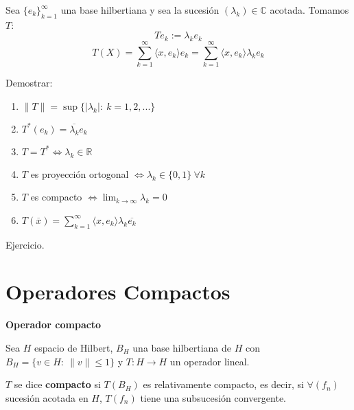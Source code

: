 \documentclass[openany]{book}
\begin{document}
\begin{proposition}
    Sea $ \{e_{k}\}_{k=1} ^{\infty}$ una base hilbertiana y sea la sucesión $ (\lambda _{k}) \in \mathbb{C}$ acotada. Tomamos $ T$:
    $$ Te_{k} := \lambda _{k} e_{k} $$
    $$ T (X) = \sum\limits_{k=1}^{\infty} \langle x, e_{k} \rangle e_{k} = \sum\limits_{k=1}^{\infty} \langle x, e_{k}  \rangle \lambda_{k} e_k $$
    
    
    Demostrar:
    \begin{enumerate}
        \item $ \|T\| = \sup \{|\lambda_k|:\ k = 1,2,...\}$
        \item $ T^* (e_k) =\overline{\lambda_k} e_k $
        \item $ T = T^* \iff \lambda_k \in \mathbb{R}$
        \item $ T$ es proyección ortogonal $ \iff \lambda_k \in \{0,1\} \ \forall k $
        \item $ T$ es compacto $ \iff \lim_{k \to \infty}\lambda_k = 0$
        \item $ T(\overline{x}) = \sum_{k=1}^{\infty} \langle x, e_k \rangle \lambda_k \overline{e_k} $
    \end{enumerate}
\end{proposition}

\begin{demonstration}
    Ejercicio.
\end{demonstration}





\section{Operadores Compactos}

\begin{definition}
    \textbf{Operador compacto}

    Sea $ H$ espacio de Hilbert, $ B_{H}$ una base hilbertiana de $ H$ con $ B_{H} = \{v \in H:\ \|v\|\leq 1\}$ y $ T:H \to H$ un operador lineal.

    $ T$ se dice \textbf{compacto} si $ T(B_{H})$ es relativamente compacto, es decir, si $ \forall (f_n)$ sucesión acotada en $ H$, $ T(f_n)$ tiene una subsucesión convergente.

\end{definition}
\end{document}
